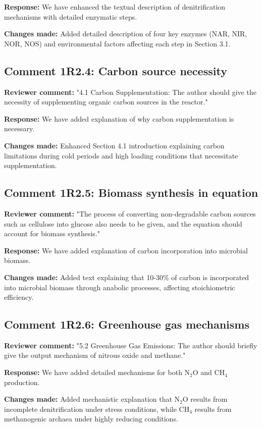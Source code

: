 \documentclass[12pt,a4paper]{article}
\begin{document}
\textbf{Response:} We have enhanced the textual description of denitrification mechanisms with detailed enzymatic steps.

\textbf{Changes made:} Added detailed description of four key enzymes (NAR, NIR, NOR, NOS) and environmental factors affecting each step in Section 3.1.

\subsection{Comment 1R2.4: Carbon source necessity}
\textbf{Reviewer comment:} "4.1 Carbon Supplementation: The author should give the necessity of supplementing organic carbon sources in the reactor."

\textbf{Response:} We have added explanation of why carbon supplementation is necessary.

\textbf{Changes made:} Enhanced Section 4.1 introduction explaining carbon limitations during cold periods and high loading conditions that necessitate supplementation.

\subsection{Comment 1R2.5: Biomass synthesis in equation}
\textbf{Reviewer comment:} "The process of converting non-degradable carbon sources such as cellulose into glucose also needs to be given, and the equation should account for biomass synthesis."

\textbf{Response:} We have added explanation of carbon incorporation into microbial biomass.

\textbf{Changes made:} Added text explaining that 10-30\% of carbon is incorporated into microbial biomass through anabolic processes, affecting stoichiometric efficiency.

\subsection{Comment 1R2.6: Greenhouse gas mechanisms}
\textbf{Reviewer comment:} "5.2 Greenhouse Gas Emissions: The author should briefly give the output mechanism of nitrous oxide and methane."

\textbf{Response:} We have added detailed mechanisms for both N$_2$O and CH$_4$ production.

\textbf{Changes made:} Added mechanistic explanation that N$_2$O results from incomplete denitrification under stress conditions, while CH$_4$ results from methanogenic archaea under highly reducing conditions.
\end{document}
